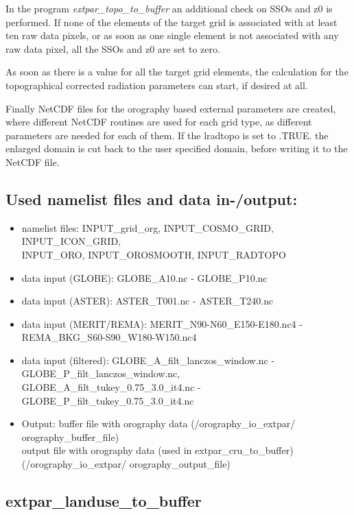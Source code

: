 \documentclass[a4paper,10pt,DIV14,BCOR1cm,titlepage,twoside]{scrartcl}
\begin{document}
In the program \textit{extpar\_topo\_to\_buffer} an additional check on SSOs and z0 is performed. If none of the elements of the target grid is associated with at least ten raw data pixels, or as soon as one single element is not associated with any raw data pixel, all the SSOs and z0 are set to zero.\par\medskip\noindent
As soon as there is a value for all the target grid elements, the calculation for the topographical corrected radiation parameters can start, if desired at all.\par\medskip\noindent
Finally NetCDF files for the orography based external parameters are created, where different NetCDF routines are used for each grid type, as different parameters are needed for each of them. If the lradtopo is set to .TRUE. the enlarged domain is cut back to the user specified domain, before writing it to the NetCDF file.\par\medskip\noindent
\subsection{Used namelist files and data in-/output:}
\begin{itemize}
 \item namelist files: INPUT\_grid\_org, INPUT\_COSMO\_GRID, INPUT\_ICON\_GRID, \\
     INPUT\_ORO, INPUT\_OROSMOOTH, INPUT\_RADTOPO
\item data input (GLOBE): GLOBE\_A10.nc - GLOBE\_P10.nc 
\item data input (ASTER): ASTER\_T001.nc - ASTER\_T240.nc 
\item data input (MERIT/REMA): MERIT\_N90-N60\_E150-E180.nc4 - REMA\_BKG\_S60-S90\_W180-W150.nc4 
\item data input (filtered): GLOBE\_A\_filt\_lanczos\_window.nc - GLOBE\_P\_filt\_lanczos\_window.nc, \\
    GLOBE\_A\_filt\_tukey\_0.75\_3.0\_it4.nc - GLOBE\_P\_filt\_tukey\_0.75\_3.0\_it4.nc
\item Output: buffer file with orography data (/orography\_io\_extpar/ orography\_buffer\_file) \\
              output file with orography data (used in extpar\_cru\_to\_buffer)\\
              (/orography\_io\_extpar/ orography\_output\_file)
\end{itemize}

\subsection{extpar\_landuse\_to\_buffer}\label{extpar_landuse_to_buffer}
\end{document}
